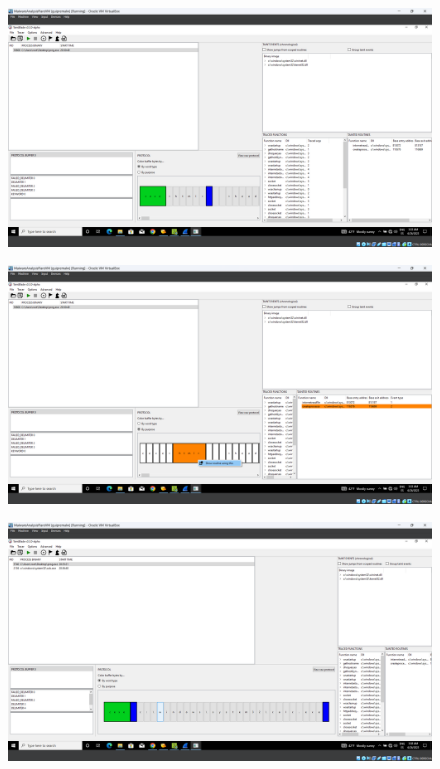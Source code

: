 \documentclass[conference]{IEEEtran}
\begin{document}
\begin{figure}
    \centerline{\includegraphics[width=\textwidth]{images/sch_s8.png}}
    \caption{}
    \label{figure:ap_sch_s8}
\end{figure}

\begin{figure}
    \centerline{\includegraphics[width=\textwidth]{images/sch_s9.png}}
    \caption{}
    \label{figure:ap_sch_s9}
\end{figure}

\begin{figure}
    \centerline{\includegraphics[width=\textwidth]{images/sch_s10.png}}
    \caption{}
    \label{figure:ap_sch_s10}
\end{figure}
\end{document}
